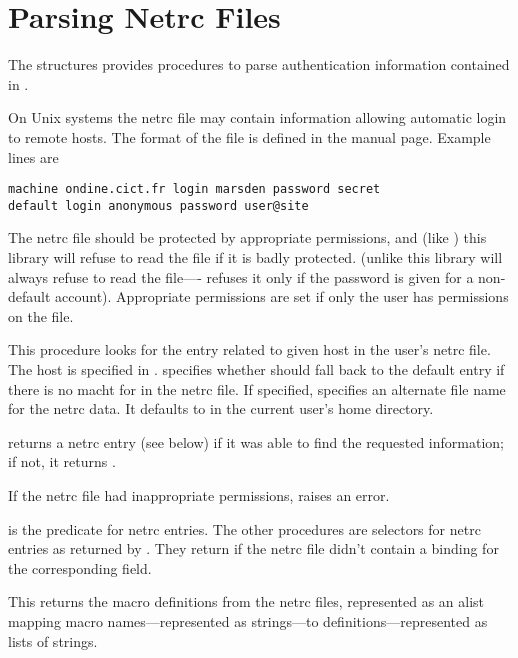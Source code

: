 \chapter{Parsing Netrc Files}\label{cha:netrc}
%
The  structures provides procedures to parse authentication
information contained in .

On Unix systems the netrc file may contain information allowing
automatic login to remote hosts.  The format of the file is defined in
the  manual page.  Example lines are
%
\begin{verbatim}
machine ondine.cict.fr login marsden password secret
default login anonymous password user@site
\end{verbatim}
%
The netrc file should be protected by appropriate permissions, and
(like ) this library will refuse to read the file if it is
badly protected.  (unlike  this library will always refuse
to read the file---- refuses it only if the password is
given for a non-default account).  Appropriate permissions are set if
only the user has permissions on the file.

\begin{desc}
  This procedure looks for the entry related to given host in the
  user's netrc file.  The host is specified in .
   specifies whether 
  should fall back to the default entry if there is no macht for
   in the netrc file.  If specified, 
  specifies an alternate file name for the netrc data.  It defaults to
   in the current user's home directory.

   returns a netrc entry (see below) if it was
  able to find the requested information; if not, it returns \sharpf.

  If the netrc file had inappropriate permissions, 
  raises an error.
\end{desc}

\begin{desc}
   is the predicate for netrc entries.  The other
  procedures are selectors for netrc entries as returned by
  .  They return \sharpf{} if the netrc file
  didn't contain a binding for the corresponding field.
\end{desc}

\begin{desc}
  This returns the macro definitions from the netrc files, represented
  as an alist mapping macro names---represented as strings---to
  definitions---represented as lists of strings.
\end{desc}

